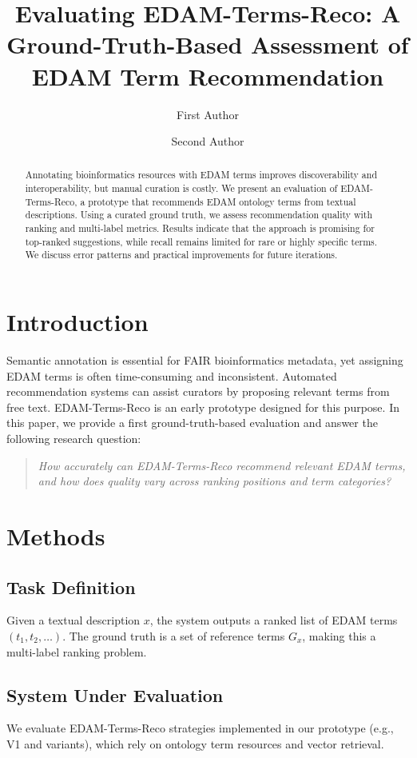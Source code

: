 \documentclass[10pt]{article}
\title{Evaluating EDAM-Terms-Reco: A Ground-Truth-Based Assessment of EDAM Term Recommendation}
\author{First Author \and Second Author}
\date{}
\begin{document}
\maketitle

\begin{abstract}
Annotating bioinformatics resources with EDAM terms improves discoverability and interoperability, but manual curation is costly.
We present an evaluation of EDAM-Terms-Reco, a prototype that recommends EDAM ontology terms from textual descriptions.
Using a curated ground truth, we assess recommendation quality with ranking and multi-label metrics.
Results indicate that the approach is promising for top-ranked suggestions, while recall remains limited for rare or highly specific terms.
We discuss error patterns and practical improvements for future iterations.
\end{abstract}

\section{Introduction}
Semantic annotation is essential for FAIR bioinformatics metadata, yet assigning EDAM terms is often time-consuming and inconsistent.
Automated recommendation systems can assist curators by proposing relevant terms from free text.
EDAM-Terms-Reco is an early prototype designed for this purpose.
In this paper, we provide a first ground-truth-based evaluation and answer the following research question:

\begin{quote}
\textit{How accurately can EDAM-Terms-Reco recommend relevant EDAM terms, and how does quality vary across ranking positions and term categories?}
\end{quote}

\section{Methods}
\subsection{Task Definition}
Given a textual description \(x\), the system outputs a ranked list of EDAM terms \((t_1, t_2, \dots)\).
The ground truth is a set of reference terms \(G_x\), making this a multi-label ranking problem.

\subsection{System Under Evaluation}
We evaluate EDAM-Terms-Reco strategies implemented in our prototype (e.g., V1 and variants), which rely on ontology term resources and vector retrieval.
\end{document}
